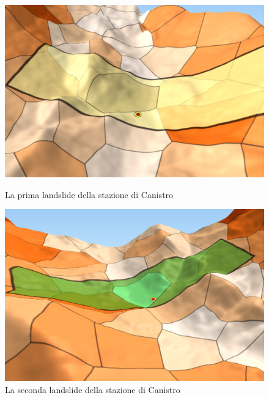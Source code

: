 \begin{figure}[h]
	\hspace{0.1\linewidth}
	\begin{minipage}[t]{0.35\linewidth}
		\centering
		\includegraphics[width=1\textwidth]{images/CanistroLandslide1}
		\caption{La prima landslide della stazione di Canistro}
		\label{canistrolandslide1}
	\end{minipage}
	\hspace{0.1\linewidth}
	\begin{minipage}[t]{0.35\linewidth}
		\centering
		\includegraphics[width=1\textwidth]{images/CanistroLandslide2}
		\caption{La seconda landslide della stazione di Canistro}
		\label{canistrolandslide2}
	\end{minipage}
\end{figure}

